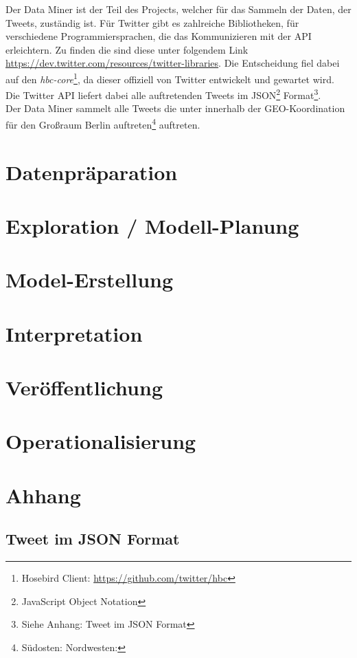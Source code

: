 Der Data Miner ist der Teil des Projects, welcher für das Sammeln der Daten, der Tweets, zuständig ist.
Für Twitter gibt es zahlreiche Bibliotheken, für verschiedene Programmiersprachen, die das Kommunizieren mit der API erleichtern. 
Zu finden die sind diese unter folgendem Link \url{https://dev.twitter.com/resources/twitter-libraries}.
Die Entscheidung fiel dabei auf den \emph{hbc-core}\footnote{Hosebird Client: \url{https://github.com/twitter/hbc}},
da dieser offiziell von Twitter entwickelt und gewartet wird.
\pagebreak
\\
Die Twitter API liefert dabei alle auftretenden Tweets im JSON\footnote{JavaScript Object Notation} Format\footnote{Siehe Anhang: Tweet im JSON Format}.
\\
Der Data Miner sammelt alle Tweets die unter innerhalb der GEO-Koordination für den Großraum Berlin auftreten\footnote{Südosten: Nordwesten:} auftreten.


\section{Datenpräparation}

\section{Exploration / Modell-Planung}

\section{Model-Erstellung}

\section{Interpretation}

\section{Veröffentlichung}



\section{Operationalisierung}

\section{Ahhang}

\subsection{Tweet im JSON Format}






